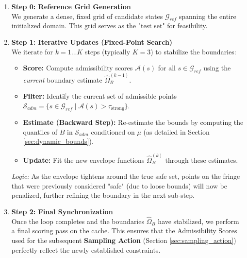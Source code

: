 \begin{enumerate}
    \item \textbf{Step 0: Reference Grid Generation} \\
    We generate a dense, fixed grid of candidate states $\mathcal{G}_{ref}$ spanning the entire initialized domain. This grid serves as the "test set" for feasibility.

    \item \textbf{Step 1: Iterative Updates (Fixed-Point Search)} \\
    We iterate for $k = 1 \dots K$ steps (typically $K=3$) to stabilize the boundaries:
    \begin{itemize}
        \item \textbf{Score:} Compute admissibility scores $\mathcal{A}(s)$ for all $s \in \mathcal{G}_{ref}$ using the \textit{current} boundary estimate $\hat{\Omega}_B^{(k-1)}$.
        \item \textbf{Filter:} Identify the current set of admissible points $\mathcal{S}_{adm} = \{s \in \mathcal{G}_{ref} \mid \mathcal{A}(s) > \tau_{\text{strong}}\}$.
        \item \textbf{Estimate (Backward Step):} Re-estimate the bounds by computing the quantiles of $B$ in $\mathcal{S}_{adm}$ conditioned on $\mu$ (as detailed in Section \ref{sec:dynamic_bounds}).
        \item \textbf{Update:} Fit the new envelope functions $\hat{\Omega}_B^{(k)}$ through these estimates.
    \end{itemize}
    \textit{Logic:} As the envelope tightens around the true safe set, points on the fringe that were previously considered "safe" (due to loose bounds) will now be penalized, further refining the boundary in the next sub-step.

    \item \textbf{Step 2: Final Synchronization} \\
    Once the loop completes and the boundaries $\hat{\Omega}_B$ have stabilized, we perform a final scoring pass on the cache. This ensures that the Admissibility Scores used for the subsequent \textbf{Sampling Action} (Section \ref{sec:sampling_action}) perfectly reflect the newly established constraints.
\end{enumerate}


